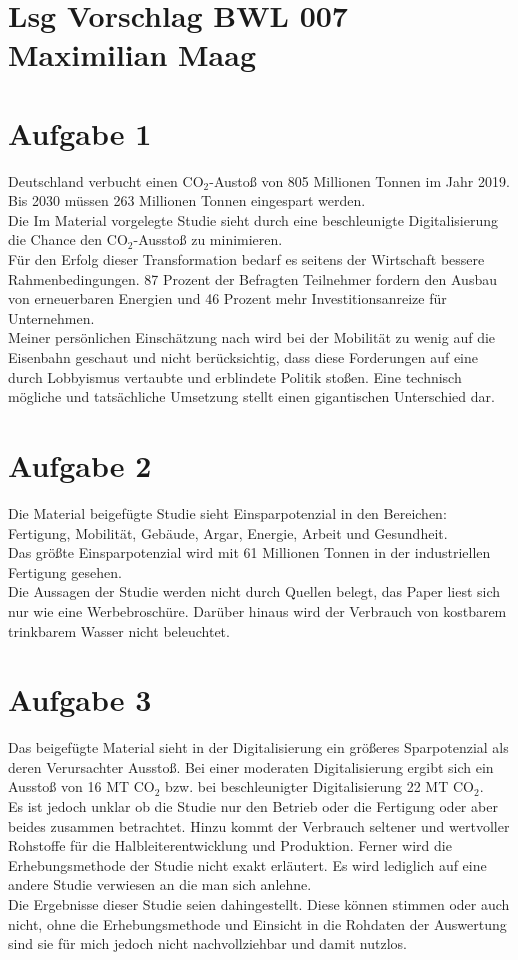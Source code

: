 \documentclass{article}
\begin{document}
	\section*{Lsg Vorschlag BWL 007 Maximilian Maag}
	\section*{Aufgabe 1}
	Deutschland verbucht einen CO$_{2}$-Austoß von 805 Millionen Tonnen im Jahr 2019. \\
	Bis 2030 müssen 263 Millionen Tonnen eingespart werden. \\
	Die Im Material vorgelegte Studie sieht durch eine beschleunigte Digitalisierung die Chance den CO$_{2}$-Ausstoß zu minimieren. \\
	Für den Erfolg dieser Transformation bedarf es seitens der Wirtschaft bessere Rahmenbedingungen. 87 Prozent der Befragten Teilnehmer fordern den Ausbau von erneuerbaren Energien und 46 Prozent mehr Investitionsanreize für Unternehmen. \\
	Meiner persönlichen Einschätzung nach wird bei der Mobilität zu wenig auf die Eisenbahn geschaut und nicht berücksichtig, dass diese Forderungen auf eine durch Lobbyismus vertaubte und erblindete Politik stoßen. Eine technisch mögliche und tatsächliche Umsetzung stellt einen gigantischen Unterschied dar.
	\section*{Aufgabe 2}
	Die Material beigefügte Studie sieht Einsparpotenzial in den Bereichen: Fertigung, Mobilität, Gebäude, Argar, Energie, Arbeit und Gesundheit. \\
	Das größte Einsparpotenzial wird mit 61 Millionen Tonnen in der industriellen Fertigung gesehen. \\
	Die Aussagen der Studie werden nicht durch Quellen belegt, das Paper liest sich nur wie eine Werbebroschüre. Darüber hinaus wird der Verbrauch von kostbarem trinkbarem Wasser nicht beleuchtet.
	\section*{Aufgabe 3}
	Das beigefügte Material sieht in der Digitalisierung ein größeres Sparpotenzial als deren Verursachter Ausstoß. Bei einer moderaten Digitalisierung ergibt sich ein Ausstoß von 16 MT CO$_{2}$ bzw. bei beschleunigter Digitalisierung 22 MT CO$_{2}$.\\
	Es ist jedoch unklar ob die Studie nur den Betrieb oder die Fertigung oder aber beides zusammen betrachtet. Hinzu kommt der Verbrauch seltener und wertvoller Rohstoffe für die Halbleiterentwicklung und Produktion. Ferner wird die Erhebungsmethode der Studie nicht exakt erläutert. Es wird lediglich auf eine andere Studie verwiesen an die man sich anlehne. \\
	Die Ergebnisse dieser Studie seien dahingestellt. Diese können stimmen oder auch nicht, ohne die Erhebungsmethode und Einsicht in die Rohdaten der Auswertung sind sie für mich jedoch nicht nachvollziehbar und damit nutzlos. 
\end{document}
